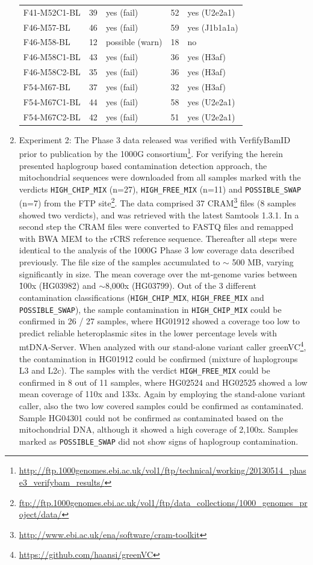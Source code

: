 \begin{enumerate}
\begin{table}[]
\begin{tabular}{|l|ll|ll|}
F41-M52C1-BL &39 & yes (fail) &52 &yes (U2e2a1) \\
F46-M57-BL &46 & yes (fail) &59 &yes (J1b1a1a) \\
F46-M58-BL &12 &possible (warn) &18 & no\\
F46-M58C1-BL &43 & yes (fail) &36 &yes (H3af) \\
F46-M58C2-BL &35 & yes (fail) &36 &yes (H3af) \\
F54-M67-BL &37 & yes (fail) &32 &yes (H3af) \\
F54-M67C1-BL &44 & yes (fail) &58 &yes (U2e2a1) \\
F54-M67C2-BL &42 & yes (fail) &51 &yes (U2e2a1)  \\
\hline
\end{tabular}
\end{table}

\item Experiment 2: The Phase 3 data released was verified with VerfifyBamID prior to publication by the 1000G consortium\footnote{\url{http://ftp.1000genomes.ebi.ac.uk/vol1/ftp/technical/working/20130514_phase3_verifybam_results/}}. For verifying the herein presented haplogroup based contamination detection approach, the mitochondrial sequences were downloaded from all samples marked with the verdicts \verb|HIGH_CHIP_MIX| (n=27), \verb|HIGH_FREE_MIX| (n=11) and \verb|POSSIBLE_SWAP| (n=7) from the FTP site\footnote{\url{ftp://ftp.1000genomes.ebi.ac.uk/vol1/ftp/data_collections/1000_genomes_project/data/}}. The data comprised 37 CRAM\footnote{\url{http://www.ebi.ac.uk/ena/software/cram-toolkit}} files (8 samples showed two verdicts), and was retrieved with the latest Samtools 1.3.1. In a second step the CRAM files were converted to FASTQ files and remapped with BWA MEM to the rCRS reference sequence. Thereafter all steps were identical to the analysis of the 1000G Phase 3 low coverage data described previously.
The file size of the samples accumulated to $\sim$ 500 MB, varying significantly in size. The mean coverage over the mt-genome varies between \~100x (HG03982) and $\sim$8,000x (HG03799). Out of the 3 different contamination classifications (\verb|HIGH_CHIP_MIX|, \verb|HIGH_FREE_MIX| and \verb|POSSIBLE_SWAP|), the sample contamination in \verb|HIGH_CHIP_MIX| could be confirmed in 26 / 27 samples, where HG01912 showed a coverage too low to predict reliable heteroplasmic sites in the lower percentage levels with mtDNA-Server. When analyzed with our stand-alone variant caller greenVC\footnote{\url{https://github.com/haansi/greenVC}}, the contamination in HG01912 could be confirmed (mixture of haplogroups L3 and L2c). The samples with the verdict \verb|HIGH_FREE_MIX| could be confirmed in 8  out of 11 samples, where HG02524 and HG02525 showed a low mean coverage of 110x and 133x. Again by employing the stand-alone variant caller, also the two low covered samples could be confirmed as contaminated. Sample HG04301 could not be confirmed as contaminated based on the mitochondrial DNA, although it showed a high coverage of 2,100x. Samples marked as \verb|POSSIBLE_SWAP| did not show signs of haplogroup contamination.


\end{enumerate}
